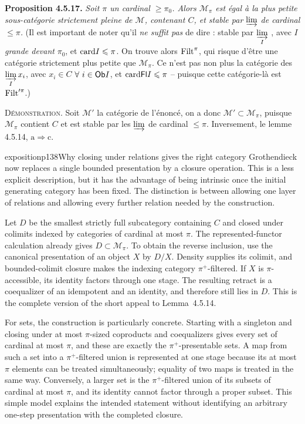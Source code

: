 \textbf{Proposition 4.5.17.} \textit{Soit $\pi$ un cardinal $\geqslant \pi_0$. Alors $\mathcal{M}_{\pi}$ est égal à la plus petite sous-catégorie strictement pleine de $\mathcal{M}$, contenant $C$, et stable par} $\varinjlim$ \textit{de cardinal $\leqslant \pi$.} (Il est important de noter qu'il \textit{ne suffit pas} de dire : stable par $\varinjlim\limits_{I}$ , avec \textit{$I$ grande devant} $\pi_0$, et $\mathrm{card} I \leqslant \pi$. On trouve alors $\mathrm{Filt}^{\pi}$, qui risque d'être une catégorie strictement plus petite que $\mathcal{M}_{\pi}$. Ce n'est pas non plus la catégorie des $\varinjlim\limits_{I} x_i$, avec $x_i \in C$ $\forall\ i \in \mathsf{Ob} I$, et $\mathrm{card} \mathsf{Fl} I \leqslant \pi$ -- puisque cette catégorie-là est $\mathrm{Filt}'^{\pi}$.)

\textsc{Démonstration}. Soit $\mathcal{M}'$ la catégorie de l'énoncé, on a donc $\mathcal{M}' \subset \mathcal{M}_{\pi}$, puisque $\mathcal{M}_{\pi}$ contient $C$ et est stable par les $\varinjlim$ de cardinal $\leqslant \pi$. Inversement, le lemme 4.5.14, $\mathrm{a} \Longrightarrow \mathrm{c}$.



\begin{dcomment}{exposition}{p138}{Why closing under relations gives the right category}
Grothendieck now replaces a single bounded presentation by a closure operation. This is a less explicit description, but it has the advantage of being intrinsic once the initial generating category has been fixed. The distinction is between allowing one layer of relations and allowing every further relation needed by the construction.

Let $D$ be the smallest strictly full subcategory containing $C$ and closed under colimits indexed by categories of cardinal at most $\pi$. The represented-functor calculation already gives $D\subset\mathcal M_\pi$. To obtain the reverse inclusion, use the canonical presentation of an object $X$ by $D/X$. Density supplies its colimit, and bounded-colimit closure makes the indexing category $\pi^+$-filtered. If $X$ is $\pi$-accessible, its identity factors through one stage. The resulting retract is a coequalizer of an idempotent and an identity, and therefore still lies in $D$. This is the complete version of the short appeal to Lemma~4.5.14.

For sets, the construction is particularly concrete. Starting with a singleton and closing under at most $\pi$-sized coproducts and coequalizers gives every set of cardinal at most $\pi$, and these are exactly the $\pi^+$-presentable sets. A map from such a set into a $\pi^+$-filtered union is represented at one stage because its at most $\pi$ elements can be treated simultaneously; equality of two maps is treated in the same way. Conversely, a larger set is the $\pi^+$-filtered union of its subsets of cardinal at most $\pi$, and its identity cannot factor through a proper subset. This simple model explains the intended statement without identifying an arbitrary one-step presentation with the completed closure.
\end{dcomment}



